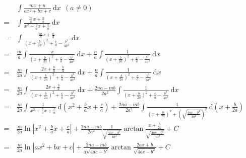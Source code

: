 \documentclass{article}
\begin{document}
	\large
	\setlength{\baselineskip}{4em}
	
	\renewcommand{\d}[1][x]{\ \text{d}#1}
	\newcommand{\mdelta}{4 a c - b^2}
	\newcommand{\denA}{x^2 + \frac{b}{a} x + \frac{c}{a}}
	\newcommand{\denB}{(x + \frac{b}{2 a})^2 + \frac{c}{a} - \frac{b^2}{4 a^2}}
	
	\begin{align*}
		&\ \int \frac{mx + n}{a x^2 + b x + c} \d \ \ (a \neq 0)
		\\
		= &\ \int \frac{\frac{m}{a} x + \frac{n}{a}}{\denA} \d
		\\
		= &\ \int \frac{\frac{m}{a} x + \frac{n}{a}}{\denB} \d
		\\
		= &\ \frac{m}{a} \int \frac{x}{\denB} \d + \frac{n}{a} \int \frac{1}{\denB} \d
		\\
		= &\ \frac{m}{2 a} \int \frac{2 x + \frac{b}{a} - \frac{b}{a}}{\denB} \d + \frac{n}{a} \int \frac{1}{\denB} \d
		\\
		= &\ \frac{m}{2 a} \int \frac{2 x + \frac{b}{a}}{\denB} \d + \frac{2 n a - m b}{2 a^2} \int \frac{1}{\denB} \d
		\\
		= &\ \frac{m}{2 a} \int \frac{1}{\denA} \d[(\denA)] + \frac{2 n a - m b}{2 a^2} \int \frac{1}{(x + \frac{b}{2 a})^2 + (\sqrt{\frac{\mdelta}{4 a^2}})^2} \d[(x + \frac{b}{2 a})]
		\\
		= &\ \frac{m}{2 a} \ln{|\denA|} + \frac{2 n a - m b}{2 a^2} \frac{1}{\sqrt{\frac{\mdelta}{4 a^2}}} \arctan\frac{x + \frac{b}{2 a}}{\sqrt{\frac{\mdelta}{4 a^2}}} + C
		\\
		= &\ \frac{m}{2 a} \ln{|a x^2 + b x + c|} + \frac{2 n a - m b}{a\sqrt{\mdelta}} \arctan\frac{2 a x + b}{\sqrt{\mdelta}} + C
	\end{align*}
\end{document}
